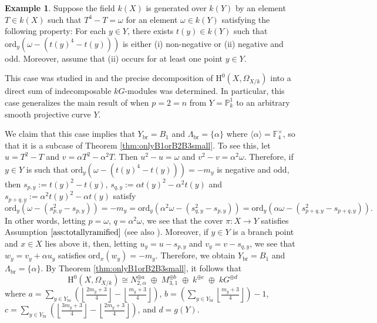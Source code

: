 \documentclass{amsart}
\numberwithin{equation}{section}
\numberwithin{table}{section}
\theoremstyle{plain}
\theoremstyle{definition}
\newtheorem{example}[theorem]{Example}
\theoremstyle{remark}
\newcommand{\HH}{\mathrm{H}}
\begin{document}
\begin{example}
\label{ex:Nickthesis}
Suppose the field $k(X)$ is generated over $k(Y)$ by an element $T\in k(X)$ such that $T^4-T=\omega$ for an element $\omega\in k(Y)$ satisfying the following property: For each $y\in Y$, there exists $t(y)\in k(Y)$ such that $\mathrm{ord}_y(\omega-(t(y)^4-t(y)))$ is either (i) non-negative or (ii) negative and odd. Moreover, assume that (ii) occurs for at least one point $y\in Y$. 

This case was studied in \cite[Section 3]{CamachoThesis2021} and the precise decomposition of $\HH^0(X,\Omega_{X/k})$ into a direct sum of indecomposable $kG$-modules was determined. In particular, this case generalizes the main result of \cite{RzedowskiCVillaSMadan1996} when $p=2=n$ from $Y=\mathbb{P}^1_k$ to an arbitrary smooth projective curve $Y$.

We claim that this case implies that $Y_{\mathrm{br}} = B_1$ and $\Lambda_{\mathrm{br}}=\{\alpha\}$ where $\langle \alpha\rangle = \mathbb{F}_4^\times$, so that it is a subcase of Theorem \ref{thm:onlyB1orB2B3small}. To see this, let $u=T^2-T$ and $v=\alpha T^2-\alpha^2 T$. Then $u^2-u=\omega$ and $v^2-v=\alpha^2\omega$. Therefore, if $y\in Y$ is such that $\mathrm{ord}_y(\omega-(t(y)^4-t(y)))=-m_y$ is negative and odd, then $s_{p,y}:=t(y)^2-t(y)$, $s_{q,y}:=\alpha t(y)^2-\alpha^2 t(y)$ and $s_{p+q,y}:=\alpha^2 t(y)^2-\alpha t(y)$ satisfy
$$\mathrm{ord}_y(\omega-(s_{p,y}^2-s_{p,y}))=-m_y=\mathrm{ord}_y(\alpha^2\omega-(s_{q,y}^2-s_{p,y}))
=\mathrm{ord}_y(\alpha\omega-(s_{p+q,y}^2-s_{p+q,y})).$$
In other words, letting $p=\omega$, $q=\alpha^2\omega$, we see that the cover $\pi:X\to Y$ satisfies Assumption $\ref{ass:totallyramified}$ (see also \cite[Proposition 3.7.10]{Stichtenoth2009}). Moreover, if $y\in Y$ is a branch point and $x\in X$ lies above it, then, letting $u_y=u-s_{p,y}$ and $v_y=v-s_{q,y}$, we see that $w_y=v_y+\alpha u_y$ satisfies $\mathrm{ord}_x(w_y) = -m_y$. Therefore, we obtain $Y_{\mathrm{br}} = B_1$ and $\Lambda_{\mathrm{br}}=\{\alpha\}$. By Theorem \ref{thm:onlyB1orB2B3small}, it follows that
$$\HH^0(X,\Omega_{X/k})\cong N_{2,\alpha}^{\oplus a} \;\oplus\; M_{3,1}^{\oplus b} \;\oplus\; k^{\oplus c} \;\oplus\; kG^{\oplus d}$$
where $a = \sum_{y\in Y_{\mathrm{br}}} \left(\left\lfloor \frac{2m_y+3}{4}\right\rfloor - \left\lfloor \frac{m_y+3}{4}\right\rfloor \right)$, $b= \left(\sum_{y\in Y_{\mathrm{br}}} \left\lfloor \frac{m_y+3}{4}\right\rfloor\right)-1$, $c= \sum_{y\in Y_{\mathrm{br}}} \left(\left\lfloor \frac{3m_y+3}{4}\right\rfloor - \left\lfloor \frac{2m_y+3}{4}\right\rfloor\right)$, and $d=g(Y)$. 
\end{example}
\end{document}
